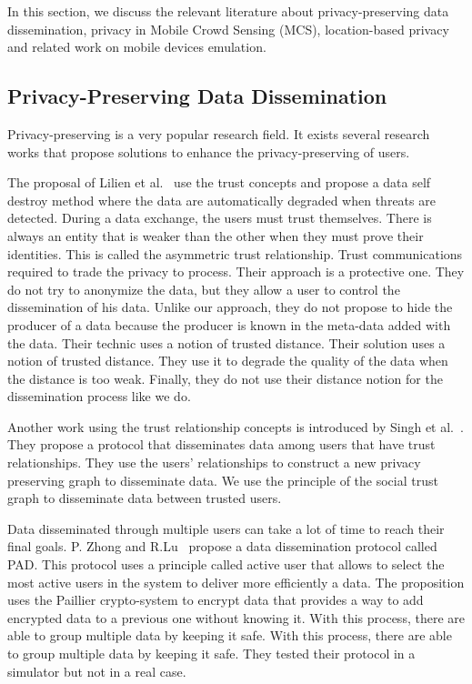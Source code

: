 

In this section, we discuss the relevant literature about privacy-preserving data dissemination, privacy in Mobile Crowd Sensing (MCS), location-based privacy and related work on mobile devices emulation.

\subsection{Privacy-Preserving Data Dissemination}

Privacy-preserving is a very popular research field.
It exists several research works that propose solutions to enhance the privacy-preserving of users.

The proposal of Lilien et al.~\cite{DBLP:journals/tsmc/LilienB06} use the trust concepts and propose a data self destroy method where the data are automatically degraded when threats are detected.
During a data exchange, the users must trust themselves.
There is always an entity that is weaker than the other when they must prove their identities.
This is called the asymmetric trust relationship.
Trust communications required to trade the privacy to process.
Their approach is a protective one.
They do not try to anonymize the data, but they allow a user to control the dissemination of his data.
Unlike our approach, they do not propose to hide the producer of a data because the producer is known in the meta-data added with the data.
Their technic uses a notion of trusted distance.
Their solution uses a notion of trusted distance.
They use it to degrade the quality of the data when the distance is too weak.
Finally, they do not use their distance notion for the dissemination process like we do.

Another work using the trust relationship concepts is introduced by Singh et al.~\cite{DBLP:conf/icdcs/SinghUSV12}.
They propose a protocol that disseminates data among users that have trust relationships.
They use the users' relationships to construct a new privacy preserving graph to disseminate data. 
We use the principle of the social trust graph to disseminate data between trusted users.

Data disseminated through multiple users can take a lot of time to reach their final goals.
P. Zhong and R.Lu~\cite{DBLP:conf/iccoms/ZhongL14} propose a data dissemination protocol called PAD.
This protocol uses a principle called active user that allows to select the most active users in the system to deliver more efficiently a data.
The proposition uses the Paillier crypto-system to encrypt data that provides a way to add encrypted data to a previous one without knowing it. 
With this process, there are able to group multiple data by keeping it safe.
With this process, there are able to group multiple data by keeping it safe.
They tested their protocol in a simulator but not in a real case.

